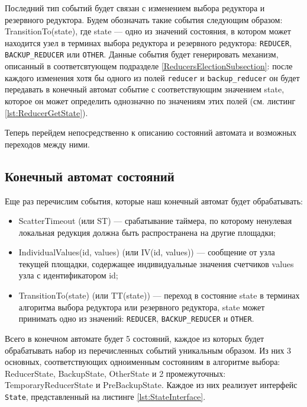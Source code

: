 Последний тип событий будет связан с изменением выбора редуктора и резервного редуктора. Будем обозначать такие события следующим образом: TransitionTo(state), где state --- одно из значений состояния, в котором может находится узел в терминах выбора редуктора и резервного редуктора: \texttt{REDUCER}, \texttt{BACKUP\_REDUCER} или \texttt{OTHER}. Данные события будет генерировать механизм, описанный в соответсвтующем подразделе \ref{ReducersElectionSubsection}: после каждого изменения хотя бы одного из полей \texttt{reducer} и \texttt{backup\_reducer} он будет передавать в конечный автомат событие с соответствующим значением state, которое он может определить однозначно по значениям этих полей (см. листинг \ref{lst:ReducerGetState}).

Теперь перейдем непосредственно к описанию состояний автомата и возможных переходов между ними.

\subsection{Конечный автомат состояний}
\label{StateMachineSubsection}

Еще раз перечислим события, которые наш конечный автомат будет обрабатывать:

\begin{itemize}
    \item ScatterTimeout (или ST) --- срабатывание таймера, по которому ненулевая локальная редукция должна быть распространена на другие площадки;
    
    \item IndividualValues(id, values) (или IV(id, values)) --- сообщение от узла текущей площадки, содержащее индивидуальные значения счетчиков values узла с идентификатором id;
    
    \item TransitionTo(state) (или TT(state)) --- переход в состояние state в терминах алгоритма выбора редуктора или резервного редуктора, state может принимать одно из значений: \texttt{REDUCER}, \texttt{BACKUP\_REDUCER} и \texttt{OTHER}.
\end{itemize}

Всего в конечном автомате будет 5 состояний, каждое из которых будет обрабатывать набор из перечисленных событий уникальным образом. Из них 3 основных, соответствующих одноименным состояниям в алгоритме выбора: ReducerState, BackupState, OtherState и 2 промежуточных: TemporaryReducerState и PreBackupState. Каждое из них реализует интерфейс \texttt{State}, представленный на листинге \ref{lst:StateInterface}.

